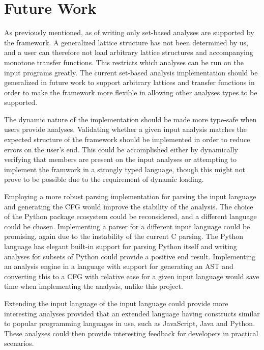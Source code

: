 \section{Future Work}

\newpar As previously mentioned, as of writing only set-based analyses are supported by the framework. A generalized lattice structure has not been determined by us, and a user can therefore not load arbitrary lattice structures and accompanying monotone transfer functions. This restricts which analyses can be run on the input programs greatly. The current set-based analysis implementation should be generalized in future work to support arbitrary lattices and transfer functions in order to make the framework more flexible in allowing other analyses types to be supported. 

\newpar The dynamic nature of the implementation should be made more type-safe when users provide analyses. Validating whether a given input analysis matches the expected structure of the framework should be implemented in order to reduce errors on the user's end. This could be accomplished either by dynamically verifying that members are present on the input analyses or attempting to implement the framwork in a strongly typed language, though this might not prove to be possible due to the requirement of dynamic loading.

\newpar Employing a more robust parsing implementation for parsing the input language and generating the CFG would improve the stability of the analysis. The choice of the Python package ecosystem could be reconsidered, and a different language could be chosen. Implementing a parser for a different input language could be promising, again due to the instability of the current C parsing. The Python language has elegant built-in support for parsing Python itself and writing analyses for subsets of Python could provide a positive end result. Implementing an analysis engine in a language with support for generating an AST and converting this to a CFG with relative ease for a given input language would save time when implementing the analysis, unlike this project.

\newpar Extending the input language of the input language could provide more interesting analyses provided that an extended language having constructs similar to popular programming languages in use, such as JavaScript, Java and Python\cite{github:languages}. These analyses could then provide interesting feedback for developers in practical scenarios.